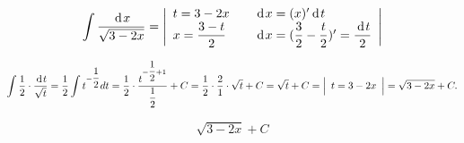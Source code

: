 {}


$$
  \int \dfrac{\hspace{2pt}\text{d}\hspace{1pt}{x}}{\sqrt{3-2x}} =
    \Bigg |
      \begin{array}{l c  l}
        t = 3-2x & & \hspace{2pt}\text{d}\hspace{1pt}{x} = (x)'\hspace{2pt}\text{d}\hspace{1pt}{t}  \\
        x = \dfrac{3-t}{2} & & \hspace{2pt}\text{d}\hspace{1pt}{x} = (\dfrac{3}{2} - \dfrac{t}{2})' = \dfrac{\hspace{2pt}\text{d}\hspace{1pt}{t}}{2} \\
      \end{array}
    \Bigg |
$$

$$
\int \dfrac{1}{2} \cdot \dfrac{\hspace{2pt}\text{d}\hspace{1pt}{t}}{\sqrt{t}} =
\dfrac{1}{2} \int t^{-\dfrac{1}{2}}dt =
\dfrac{1}{2} \cdot \dfrac{t^{-\dfrac{1}{2}+1}}{\dfrac{1}{2}} + C =
\dfrac{1}{2} \cdot \dfrac{2}{1} \cdot \sqrt{t} + C = \sqrt{t} + C =
\Big |
  \begin{array}{c}
    t = 3-2x
  \end{array}
\Big | =
\sqrt{3-2x} + C.
$$

$$
\boxed{\sqrt{3-2x} + C}
$$

